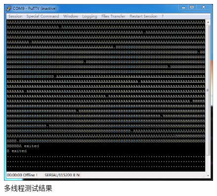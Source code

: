 \documentclass[main.tex]{subfiles}
\begin{document}
\begin{CJK*}{UTF8}{song}
\begin{figure}[htp]
\centering
\includegraphics[scale=0.4]{figures/5-3}
\caption{多线程测试结果}
\label{figure:5-3}
\end{figure}


\clearpage
\ifxetex\else\end{CJK*}\fi
\end{document}
